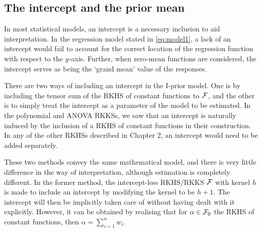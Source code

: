 \subsection{The intercept and the prior mean}\label{sec:intercept}

In most statistical models, an intercept is a necessary inclusion to aid interpretation.
In the regression model stated in \eqref{eq:model1}, a lack of an intercept would fail to account for the correct location of the regression function with respect to the $y$-axis.
Further, when zero-mean functions are considered, the intercept serves as being the `grand mean' value of the responses.

There are two ways of including an intercept in the I-prior model.
One is by including the tensor sum of the RKHS of constant functions to ${\mathcal F}$, and the other is to simply treat the intercept as a parameter of the model to be estimated.
In the polynomial and ANOVA RKKSs, we saw that an intercept is naturally induced by the inclusion of a RKHS of constant functions in their construction.
In any of the other RKHSs described in Chapter 2, an intercept would need to be added separately.

These two methods convey the same mathematical model, and there is very little difference in the way of interpretation, although estimation is completely different. 
In the former method, the intercept-less RKHS/RKKS ${\mathcal F}$ with kernel $h$ is made to include an intercept by modifying the kernel to be $h + 1$.
The intercept will then be implicitly taken care of without having dealt with it explicitly.
However, it can be obtained by realising that for $\alpha\in{\mathcal F}_0$ the RKHS of constant functions, then $\alpha = \sum_{i=1}^n w_i$.

